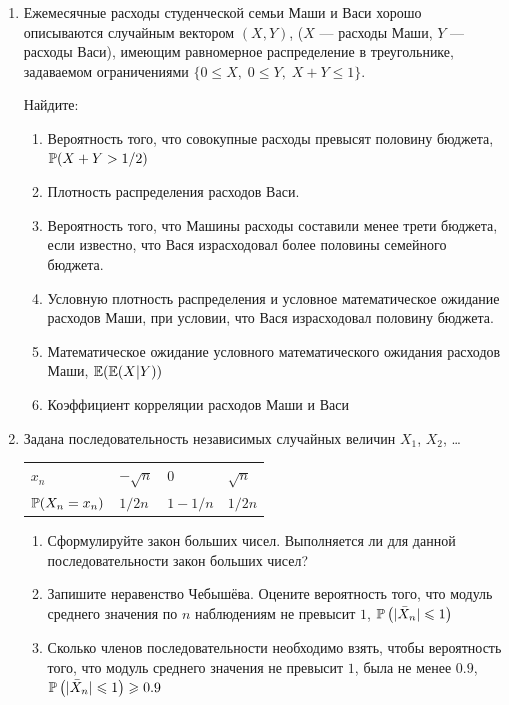 \begin{enumerate}
\item Ежемесячные расходы студенческой семьи Маши и Васи хорошо описываются случайным
вектором $(X,Y)$, ($X$ — расходы Маши, $Y$ — расходы Васи), имеющим равномерное
распределение в треугольнике, задаваемом ограничениями $\{0 \leq X, \; 0\leq Y,
\; X+Y \leq 1 \}$.

Найдите:

\begin{enumerate}
\item Вероятность того, что совокупные расходы превысят половину бюджета, $\P(X+Y>1/2)$
\item Плотность распределения расходов Васи.
\item Вероятность того, что Машины расходы составили менее трети бюджета, если
известно, что Вася израсходовал более половины семейного бюджета.
\item Условную плотность распределения и условное математическое ожидание расходов Маши,
при условии, что Вася израсходовал половину бюджета.
\item Математическое ожидание условного математического ожидания расходов Маши,
$\E(\E(X|Y))$
\item Коэффициент корреляции расходов Маши и Васи
\end{enumerate}

\item Задана последовательность независимых случайных величин $X_1$, $X_2$, \ldots

\begin{center}
\begin{tabular}{llll}
\toprule
$x_n$ & $-\sqrt{n}$ & $0$ & $\sqrt{n}$ \\
$\P(X_n = x_n)$ & $1/2n$ & $1-1/n$ & $1/2n$ \\
\bottomrule
\end{tabular}
\end{center}

\begin{enumerate}
\item Сформулируйте закон больших чисел. Выполняется ли для данной последовательности
закон больших чисел?
\item Запишите неравенство Чебышёва. Оцените вероятность того, что модуль среднего
значения по $n$ наблюдениям не превысит $1$, $\P\left(|\bar X_n| \leq 1\right)$
\item Сколько членов последовательности необходимо взять, чтобы вероятность того, что
модуль среднего значения не превысит $1$, была не менее $0.9$, $\P\left(|\bar X_n| \leq 1\right)\geq 0.9$
\end{enumerate}


\end{enumerate}
